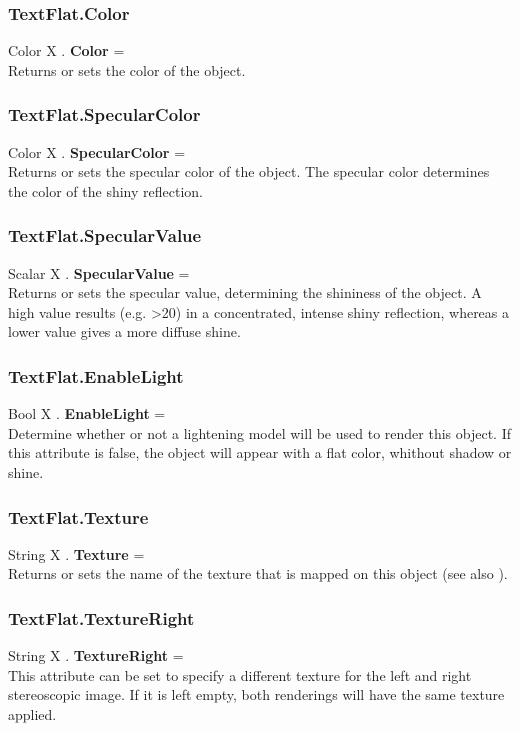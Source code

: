 \subsubsection{TextFlat.Color \label{F:TextFlat:Color}}
Color X . \textbf{Color} = \\
Returns or sets the color of the object.

\subsubsection{TextFlat.SpecularColor \label{F:TextFlat:SpecularColor}}
Color X . \textbf{SpecularColor} = \\
Returns or sets the specular color of the object. The specular color determines the color of the shiny reflection.

\subsubsection{TextFlat.SpecularValue \label{F:TextFlat:SpecularValue}}
Scalar X . \textbf{SpecularValue} = \\
Returns or sets the specular value, determining the shininess of the object. A high value results (e.g. >20) in a concentrated, intense shiny reflection, whereas a lower value gives a more diffuse shine.

\subsubsection{TextFlat.EnableLight \label{F:TextFlat:EnableLight}}
Bool X . \textbf{EnableLight} = \\
Determine whether or not a lightening model will be used to render this object. If this attribute is false, the object will appear with a flat color, whithout shadow or shine.

\subsubsection{TextFlat.Texture \label{F:TextFlat:Texture}}
String X . \textbf{Texture} = \\
Returns or sets the name of the texture that is mapped on this object (see also ).

\subsubsection{TextFlat.TextureRight \label{F:TextFlat:TextureRight}}
String X . \textbf{TextureRight} = \\
This attribute can be set to specify a different texture for the left and right stereoscopic image. If it is left empty, both renderings will have the same texture applied.

